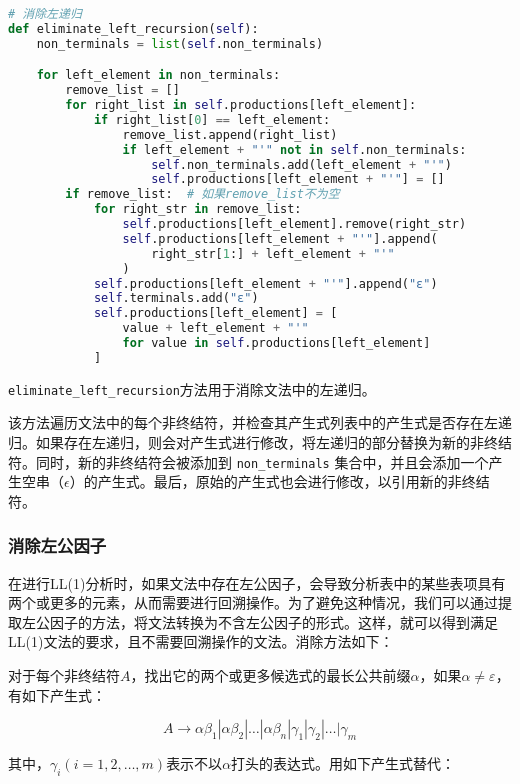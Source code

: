 \documentclass[lang=cn,11pt,a4paper]{elegantpaper}
\begin{document}
\begin{lstlisting}[language=Python]
# 消除左递归
def eliminate_left_recursion(self):
    non_terminals = list(self.non_terminals)

    for left_element in non_terminals:
        remove_list = []
        for right_list in self.productions[left_element]:
            if right_list[0] == left_element:
                remove_list.append(right_list)
                if left_element + "'" not in self.non_terminals:
                    self.non_terminals.add(left_element + "'")
                    self.productions[left_element + "'"] = []
        if remove_list:  # 如果remove_list不为空
            for right_str in remove_list:
                self.productions[left_element].remove(right_str)
                self.productions[left_element + "'"].append(
                    right_str[1:] + left_element + "'"
                )
            self.productions[left_element + "'"].append("ε")
            self.terminals.add("ε")
            self.productions[left_element] = [
                value + left_element + "'"
                for value in self.productions[left_element]
            ]
\end{lstlisting}


\lstinline{eliminate_left_recursion}方法用于消除文法中的左递归。


该方法遍历文法中的每个非终结符，并检查其产生式列表中的产生式是否存在左递归。如果存在左递归，则会对产生式进行修改，将左递归的部分替换为新的非终结符。同时，新的非终结符会被添加到 \lstinline{non_terminals} 集合中，并且会添加一个产生空串（$\epsilon$）的产生式。最后，原始的产生式也会进行修改，以引用新的非终结符。

\subsubsection{消除左公因子}

在进行LL(1)分析时，如果文法中存在左公因子，会导致分析表中的某些表项具有两个或更多的元素，从而需要进行回溯操作。为了避免这种情况，我们可以通过提取左公因子的方法，将文法转换为不含左公因子的形式。这样，就可以得到满足LL(1)文法的要求，且不需要回溯操作的文法。消除方法如下：

对于每个非终结符$A$，找出它的两个或更多候选式的最长公共前缀$\alpha$，如果$\alpha\not=\varepsilon$，有如下产生式：

$$
A\rightarrow \alpha\beta_1|\alpha\beta_2|\ldots|\alpha\beta_n|\gamma_1|\gamma_2|\ldots|\gamma_m
$$

其中，$\gamma_i(i=1,2,\ldots,m)$表示不以$\alpha$打头的表达式。用如下产生式替代：
\end{document}
